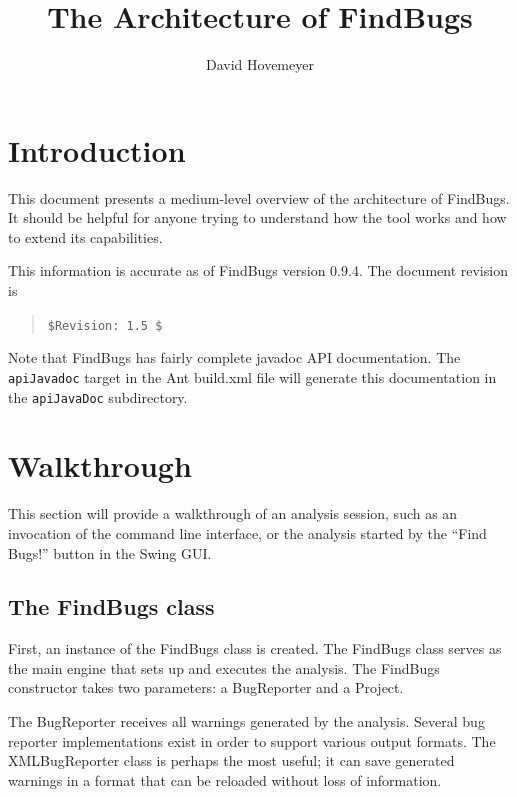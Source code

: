 \documentclass[11pt]{article}
\title{The Architecture of FindBugs}
\author{David Hovemeyer}
\date{}
\begin{document}
\maketitle
\tableofcontents

\section*{Introduction}

This document presents a medium-level overview of the architecture
of FindBugs.  It should be helpful for anyone trying to understand how
the tool works and how to extend its capabilities.

This information is accurate as of FindBugs version 0.9.4.
The document revision is
\begin{quote}
\verb+$Revision: 1.5 $+
\end{quote}

Note that FindBugs has fairly complete javadoc API documentation.
The {\tt apiJavadoc} target in the Ant build.xml file will generate
this documentation in the {\tt apiJavaDoc} subdirectory.

\section{Walkthrough}

This section will provide a walkthrough of an analysis session,
such as an invocation of the command line interface, or the analysis
started by the ``Find Bugs!'' button in the Swing GUI.

\subsection{The FindBugs class}


First, an instance of the FindBugs class is created.
The FindBugs class serves as the main engine that sets up and executes the
analysis.  The FindBugs constructor takes
two parameters: a BugReporter and a Project.

The BugReporter receives all warnings generated by the analysis.
Several bug reporter implementations exist in order to support various
output formats.  The XMLBugReporter class is perhaps the most useful;
it can save generated warnings in a format that can be reloaded without
loss of information.  
\end{document}

